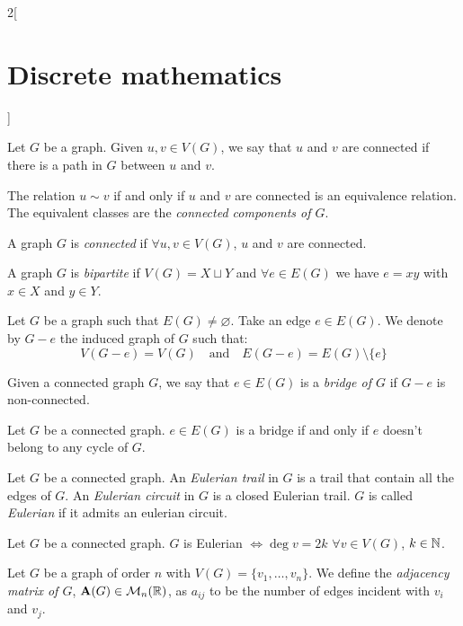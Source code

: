 \documentclass[../../../main.tex]{subfiles}
\begin{document}
\begin{multicols}{2}[\section{Discrete mathematics}]
\begin{prop}
    \end{prop}
    \begin{definition}
        Let $G$ be a graph. Given $u,v\in V(G)$, we say that $u$ and $v$ are connected if there is a path in $G$ between $u$ and $v$.
    \end{definition}
    \begin{prop}
        The relation $u\sim v$ if and only if $u$ and $v$ are connected is an equivalence relation. The equivalent classes are the \textit{connected components of $G$}.
    \end{prop}
    \begin{definition}
        A graph $G$ is \textit{connected} if $\forall u,v\in V(G)$, $u$ and $v$ are connected.
    \end{definition}
    \begin{definition}
        A graph $G$ is \textit{bipartite} if $V(G)=X\sqcup Y$ and $\forall e\in E(G)$ we have $e=xy$ with $x\in X$ and $y\in Y$.
    \end{definition}
    \begin{definition}
        Let $G$ be a graph such that $E(G)\ne\varnothing$. Take an edge $e\in E(G)$. We denote by $G-e$ the induced graph of $G$ such that: $$V(G-e)=V(G)\quad\text{and}\quad E(G-e)=E(G)\setminus\{e\}$$
    \end{definition}
    \begin{definition}
        Given a connected graph $G$, we say that $e\in E(G)$ is a \textit{bridge of $G$} if $G-e$ is non-connected.
    \end{definition}
    \begin{prop}
        Let $G$ be a connected graph. $e\in E(G)$ is a bridge if and only if $e$ doesn't belong to any cycle of $G$.
    \end{prop}
    \begin{definition}
        Let $G$ be a connected graph. An \textit{Eulerian trail} in $G$ is a trail that contain all the edges of $G$. An \textit{Eulerian circuit} in $G$ is a closed Eulerian trail. $G$ is called \textit{Eulerian} if it admits an eulerian circuit.
    \end{definition}
    \begin{theorem}
        Let $G$ be a connected graph. $G$ is Eulerian $\iff\deg v=2k$ $\forall v\in V(G)$, $k\in\mathbb{N} $.
    \end{theorem}
    \begin{definition}
        Let $G$ be a graph of order $n$ with $V(G)=\{v_1,\ldots,v_n\}$. We define the \textit{adjacency matrix of $G$}, $\vb{A}(G)\in\mathcal{M}_n(\mathbb{R} )$, as $a_{ij}$ to be the number of edges incident with $v_i$ and $v_j$.

\end{definition}
\end{multicols}
\end{document}
